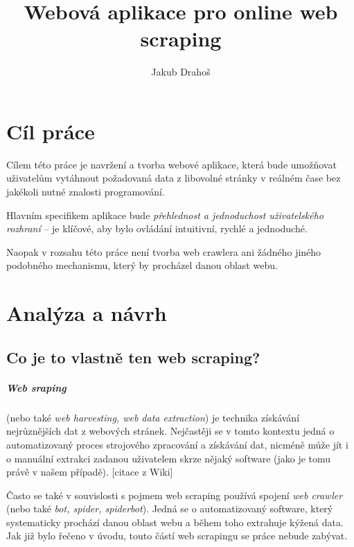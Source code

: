 \documentclass[thesis=B,czech]{FITthesis}[2012/06/26]
\title{Webová aplikace pro online web scraping}
\author{Jakub Drahoš} %
\begin{document}

\begin{introduction}
\end{introduction}


\chapter{Cíl práce}

Cílem této práce je navržení a tvorba webové aplikace, která bude umož\v{n}ovat uživatelům vytáhnout požadovaná data z libovolné stránky v reálném čase bez jakékoli nutné znalosti programování.

Hlavním specifikem aplikace bude \emph{přehlednost a jednoduchost uživatelského rozhraní} -- je klíčové, aby bylo ovládání intuitivní, rychlé a jednoduché.

Naopak v rozsahu této práce není tvorba web crawlera ani žádného jiného podobného mechanismu, který by procházel danou oblast webu.


\chapter{Analýza a návrh}

\section{Co je to vlastně ten web scraping?}
\paragraph{Web sraping}
(nebo také \emph{web harvesting, web data extraction}) je technika získávání nejrůznějších dat z webových stránek. Nejčastěji se v tomto kontextu jedná o automatizovaný proces strojového zpracování a získávání dat, nicméně může jít i o manuální extrakci zadanou uživatelem skrze nějaký software (jako je tomu právě v našem případě). [citace z Wiki]

Často se také v souvislosti s pojmem web scraping používá spojení \emph{web crawler} (nebo také \emph{bot, spider, spiderbot}). Jedná se o automatizovaný software, který systematicky prochází danou oblast webu a během toho extrahuje kýžená data. Jak již bylo řečeno v úvodu, touto částí web scrapingu se práce nebude zabývat.
\end{document}
